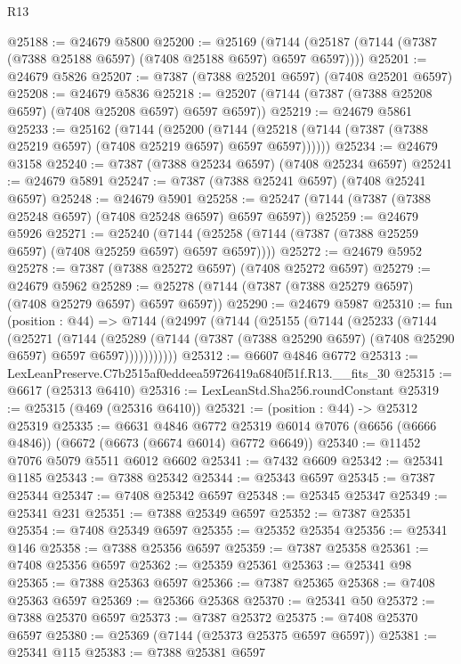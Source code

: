 \begin{lexlean}{R13}
\begin{coremodule}
@25188 := @24679 @5800
@25200 := @25169
    (@7144 (@25187 (@7144 (@7387 (@7388 @25188 @6597) (@7408 @25188 @6597) @6597 @6597))))
@25201 := @24679 @5826
@25207 := @7387 (@7388 @25201 @6597) (@7408 @25201 @6597)
@25208 := @24679 @5836
@25218 := @25207 (@7144 (@7387 (@7388 @25208 @6597) (@7408 @25208 @6597) @6597 @6597))
@25219 := @24679 @5861
@25233 := @25162
    (@7144
      (@25200
        (@7144 (@25218 (@7144 (@7387 (@7388 @25219 @6597) (@7408 @25219 @6597) @6597 @6597))))))
@25234 := @24679 @3158
@25240 := @7387 (@7388 @25234 @6597) (@7408 @25234 @6597)
@25241 := @24679 @5891
@25247 := @7387 (@7388 @25241 @6597) (@7408 @25241 @6597)
@25248 := @24679 @5901
@25258 := @25247 (@7144 (@7387 (@7388 @25248 @6597) (@7408 @25248 @6597) @6597 @6597))
@25259 := @24679 @5926
@25271 := @25240
    (@7144 (@25258 (@7144 (@7387 (@7388 @25259 @6597) (@7408 @25259 @6597) @6597 @6597))))
@25272 := @24679 @5952
@25278 := @7387 (@7388 @25272 @6597) (@7408 @25272 @6597)
@25279 := @24679 @5962
@25289 := @25278 (@7144 (@7387 (@7388 @25279 @6597) (@7408 @25279 @6597) @6597 @6597))
@25290 := @24679 @5987
@25310 := fun (position : @44) =>
  @7144
    (@24997
      (@7144
        (@25155
          (@7144
            (@25233
              (@7144
                (@25271
                  (@7144
                    (@25289
                      (@7144 (@7387 (@7388 @25290 @6597) (@7408 @25290 @6597) @6597 @6597)))))))))))
@25312 := @6607 @4846 @6772
@25313 := LexLeanPreserve.C7b2515af0eddeea59726419a6840f51f.R13.__fits_30
@25315 := @6617 (@25313 @6410)
@25316 := LexLeanStd.Sha256.roundConstant
@25319 := @25315 (@469 (@25316 @6410))
@25321 := (position : @44) -> @25312 @25319
@25335 := @6631
    @4846
    @6772
    @25319
    @6014
    @7076
    (@6656 (@6666 @4846))
    (@6672 (@6673 (@6674 @6014) @6772 @6649))
@25340 := @11452 @7076 @5079 @5511 @6012 @6602
@25341 := @7432 @6609
@25342 := @25341 @1185
@25343 := @7388 @25342
@25344 := @25343 @6597
@25345 := @7387 @25344
@25347 := @7408 @25342 @6597
@25348 := @25345 @25347
@25349 := @25341 @231
@25351 := @7388 @25349 @6597
@25352 := @7387 @25351
@25354 := @7408 @25349 @6597
@25355 := @25352 @25354
@25356 := @25341 @146
@25358 := @7388 @25356 @6597
@25359 := @7387 @25358
@25361 := @7408 @25356 @6597
@25362 := @25359 @25361
@25363 := @25341 @98
@25365 := @7388 @25363 @6597
@25366 := @7387 @25365
@25368 := @7408 @25363 @6597
@25369 := @25366 @25368
@25370 := @25341 @50
@25372 := @7388 @25370 @6597
@25373 := @7387 @25372
@25375 := @7408 @25370 @6597
@25380 := @25369 (@7144 (@25373 @25375 @6597 @6597))
@25381 := @25341 @115
@25383 := @7388 @25381 @6597

\end{coremodule}
\end{lexlean}
